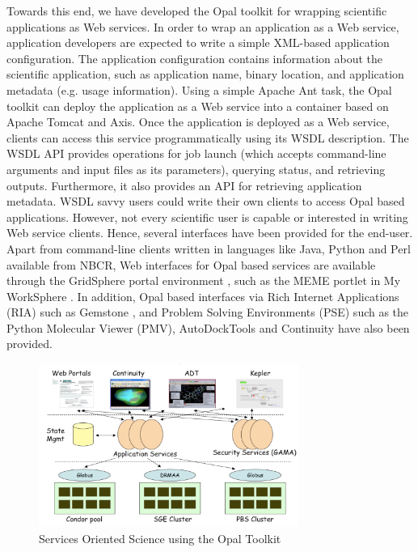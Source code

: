 \documentclass[conference]{IEEEtran}
\begin{document}
Towards this end, we have developed the Opal toolkit \cite{opal} for
wrapping scientific applications as Web services. In order to wrap an
application as a Web service, application developers are expected to write
a simple XML-based application configuration. The application configuration
contains information about the scientific application, such as application
name, binary location, and application metadata (e.g. usage information).
Using a simple Apache Ant task, the Opal toolkit can deploy the application
as a Web service into a container based on Apache Tomcat and Axis. Once the
application is deployed as a Web service, clients can access this service
programmatically using its WSDL description. The WSDL API provides
operations for job launch (which accepts command-line arguments and input
files as its parameters), querying status, and retrieving outputs.
Furthermore, it also provides an API for retrieving application metadata.
WSDL savvy users could write their own clients to access Opal based
applications. However, not every scientific user is capable or interested
in writing Web service clients. Hence, several interfaces have been
provided for the end-user. Apart from command-line clients written in
languages like Java, Python and Perl available from NBCR, Web interfaces
for Opal based services are available through the GridSphere portal
environment \cite{gridsphere}, such as the MEME portlet in My WorkSphere
\cite{myworksphere}. In addition, Opal based interfaces via Rich Internet
Applications (RIA) such as Gemstone \cite{gemstone}, and Problem Solving
Environments (PSE) such as the Python Molecular Viewer (PMV), AutoDockTools
\cite{pmv-vision-adt} and Continuity \cite{continuity} have also been provided.

\begin{figure}
\begin{center}
\includegraphics[width=8.5cm]{architecture}
\end{center}
\caption{Services Oriented Science using the Opal Toolkit}
\label{fig:arch}
\end{figure}
\end{document}
